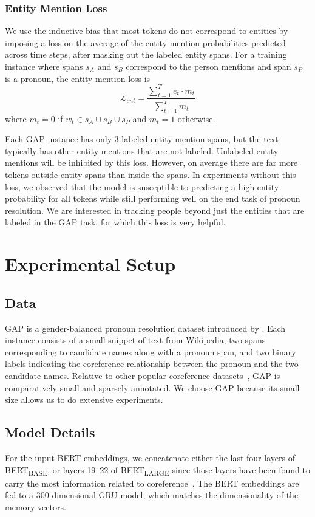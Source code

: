 \documentclass[11pt,a4paper]{article}
\newcommand{\bertbase}{BERT\textsubscript{BASE}\xspace}
\newcommand{\bertlarge}{BERT\textsubscript{LARGE}\xspace}
\begin{document}
\subsubsection{Entity Mention Loss}
\label{sec:ent_pred_loss}
We use the inductive bias that most tokens do not correspond to entities by imposing a loss on the average of the entity mention probabilities predicted across time steps, after masking out the labeled entity spans. 
For a training instance where spans $s_A$ and $s_B$ correspond to the person mentions and span $s_P$ is a pronoun, the entity mention loss is \vspace{-0.05in}
$$\mathcal{L}_{\mathit{ent}} = \frac{\sum_{t=1}^T e_t \cdot m_t}{\sum_{t=1}^T m_t}$$ 
where $m_t = 0$ if $w_t \in s_A \cup s_B \cup s_P$ and $m_t = 1$ otherwise. 

Each GAP instance has only 3 labeled entity mention spans, but the text typically has other entity mentions that are not labeled. 
Unlabeled entity mentions will be 
inhibited by this loss. However, on average there are far more tokens outside entity spans than inside the spans. 
In experiments without this loss, we observed that the model is susceptible to 
predicting a high entity probability for all tokens while still performing well on the end task of pronoun resolution. We are interested in tracking people beyond just the entities that are labeled in the GAP task, 
for which this loss is very helpful. 


 
 \section{Experimental Setup}
\subsection{Data}
GAP is a gender-balanced pronoun resolution dataset
introduced by \citet{webster2018gap}.
Each instance consists of a small snippet of text from Wikipedia, two spans corresponding to candidate names along with a pronoun span, and two binary labels indicating the coreference relationship between the pronoun and the two candidate names. Relative to other popular coreference datasets~\cite{pradhan2012conll, chen-etal-2018-preco},
GAP is comparatively small and sparsely annotated. We choose GAP because its small size allows us to do extensive experiments.






\subsection{Model Details}
For the input BERT embeddings, we concatenate either the last four layers of \bertbase, or layers 19--22 of \bertlarge since those layers have been found to carry the most information related to coreference~\cite{liu2019linguistic}. The BERT embeddings are fed to a 300-dimensional GRU model, which matches the dimensionality of the memory vectors.
\end{document}
